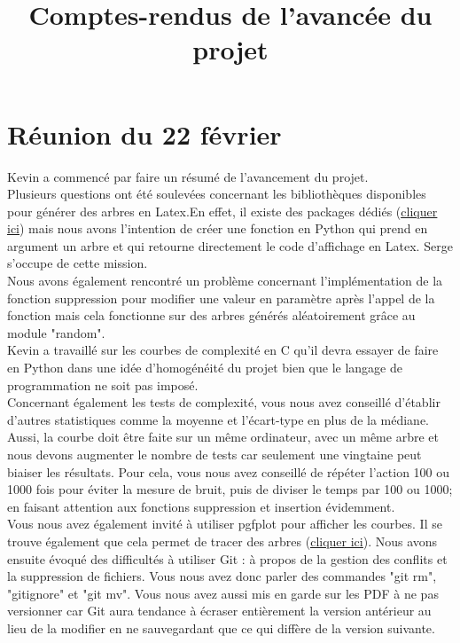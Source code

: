 \documentclass{report}
\begin{document}
\title{Comptes-rendus de l'avancée du projet}
\author{}
\date{}
\maketitle
\tableofcontents
\newpage
\section{Réunion du 22 février}

Kevin a commencé par faire un résumé de l'avancement du projet.\\
Plusieurs questions ont été soulevées concernant les bibliothèques disponibles pour générer des arbres en Latex.En effet, il existe des packages dédiés (\href{https://tex.stackexchange.com/questions/5447/how-can-i-draw-simple-trees-in-latex}{\underline{cliquer ici}}) mais nous avons l'intention de créer une fonction en Python qui prend en argument un arbre et qui retourne directement le code d'affichage en Latex. Serge s'occupe de cette mission. \\

Nous avons également rencontré un problème concernant l'implémentation de la fonction suppression pour modifier une valeur en paramètre après l'appel de la fonction mais cela fonctionne sur des arbres générés aléatoirement grâce au module "random". \\
Kevin a travaillé sur les courbes de complexité en C qu'il devra essayer de faire en Python dans une idée d'homogénéité du projet bien que le langage de programmation ne soit pas imposé. \\

Concernant également les tests de complexité, vous nous avez conseillé d'établir d'autres statistiques comme la moyenne et l'écart-type en plus de la médiane. Aussi, la courbe doit être faite sur un même ordinateur, avec un même arbre et nous devons augmenter le nombre de tests car seulement une vingtaine peut biaiser les résultats. Pour cela, vous nous avez conseillé de répéter l'action 100 ou 1000 fois pour éviter la mesure de bruit, puis de diviser le temps par 100 ou 1000; en faisant attention aux fonctions suppression et insertion évidemment. \\

Vous nous avez également invité à utiliser pgfplot pour afficher les courbes. Il se trouve également que cela permet de tracer des arbres (\href{https://tex.stackexchange.com/questions/203399/drawing-binary-trees-with-latex-labels}{\underline{cliquer ici}}).
Nous avons ensuite évoqué des difficultés à utiliser Git : à propos de la gestion des conflits et la suppression de fichiers. Vous nous avez donc parler des commandes "git rm", "gitignore" et "git mv". Vous nous avez aussi mis en garde sur les PDF à ne pas versionner car Git aura tendance à écraser entièrement la version antérieur au lieu de la modifier en ne sauvegardant que ce qui diffère de la version suivante.\\
\end{document}
